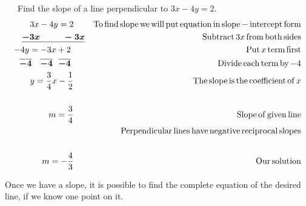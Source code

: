 \begin{example}\label{Lin70}~~~Find the slope of a line perpendicular to $3 x - 4 y = 2$.
  \begin{eqnarray*}
    3 x - 4 y = 2~~~~ &  & \operatorname{To} \operatorname{find} \operatorname{slope} \operatorname{we}
    \operatorname{will} \operatorname{put} \operatorname{equation} \operatorname{in} \operatorname{slope} -
    \operatorname{intercept} \operatorname{form}\\
    \boldsymbol{\underline{- 3 x ~~~~~~~~- 3 x}} &  & \operatorname{Subtract} 3 x \operatorname{from} \operatorname{both}
    \operatorname{sides}\\
    - 4 y = - 3 x + 2~~~~~ &  & \operatorname{Put} x \operatorname{term} \operatorname{first}\\
    \boldsymbol{\overline{- 4} ~~~ \overline{- 4} ~~ \overline{- 4}}~~~~~ &  & \operatorname{Divide}
    \operatorname{each} \operatorname{term} \operatorname{by} - 4\\
    y = \frac{3}{4} x - \frac{1}{2}~~~~ &  & \operatorname{The} \operatorname{slope} \operatorname{is}
    \operatorname{the} \operatorname{coefficient} \operatorname{of} x\\
    &  & \\
    m = \frac{3}{4}~~~~ &  & \operatorname{Slope} \operatorname{of} \operatorname{given} \operatorname{line}\\
		& & \operatorname{Perpendicular} \operatorname{lines} \operatorname{have} \operatorname{negative}
    \operatorname{reciprocal} \operatorname{slopes}\\
    &  & \\
    m = - \frac{4}{3}~~~~ &  & \operatorname{Our} \operatorname{solution}
  \end{eqnarray*}
\end{example}

 Once we have a slope, it is possible to find the complete equation of the
desired line, if we know one point on it.

\pagebreak

